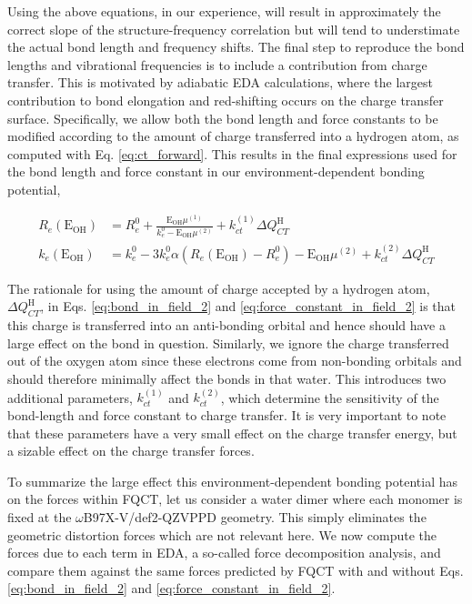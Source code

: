 \documentclass[journal=jctcce,manuscript=article]{achemso}
\begin{document}
Using the above equations, in our experience, will result in approximately the correct slope of the structure-frequency correlation but will tend to understimate the actual bond length and frequency shifts. The final step to reproduce the bond lengths and vibrational frequencies is to include a contribution from charge transfer. This is motivated by adiabatic EDA calculations, where the largest contribution to bond elongation and red-shifting occurs on the charge transfer surface.\cite{mao2017energy} Specifically, we allow both the bond length and force constants to be modified according to the amount of charge transferred into a hydrogen atom, as computed with Eq. \ref{eq:ct_forward}. This results in the final expressions used for the bond length and force constant in our environment-dependent bonding potential,

\begin{align}
  \label{eq:bond_in_field_2}
  R_e(\mathrm{E_{OH}})&=R_e^0+ \frac{\mathrm{E_{OH}}\mu^{(1)}}{k_e^0-\mathrm{E_{OH}}\mu^{(2)}} + k_{ct}^{(1)}\Delta Q_{CT}^{\mathrm{H}} \\
  \label{eq:force_constant_in_field_2}
  k_e(\mathrm{E_{OH}})&=k_e^0-3k_e^0\alpha\left(R_e(\mathrm{E_{OH}})-R_e^0\right)-\mathrm{E_{OH}}\mu^{(2)}+k_{ct}^{(2)}\Delta Q_{CT}^{\mathrm{H}}
\end{align}

The rationale for using the amount of charge accepted by a hydrogen atom, $\Delta Q_{CT}^{\mathrm{H}}$, in Eqs. \ref{eq:bond_in_field_2} and \ref{eq:force_constant_in_field_2} is that this charge is transferred into an anti-bonding orbital and hence should have a large effect on the  bond in question. Similarly, we ignore the charge transferred out of the oxygen atom since these electrons come from non-bonding orbitals and should therefore minimally affect the  bonds in that water. This introduces two additional parameters, $k_{ct}^{(1)}$ and $k_{ct}^{(2)}$, which determine the sensitivity of the bond-length and force constant to charge transfer. It is very important to note that these parameters have a very small effect on the charge transfer energy, but a sizable effect on the charge transfer forces.

To summarize the large effect this environment-dependent bonding potential has on the forces within FQCT, let us consider a water dimer where each monomer is fixed at the $\omega$B97X-V/def2-QZVPPD geometry. This simply eliminates the geometric distortion forces which are not relevant here. We now compute the forces due to each term in EDA, a so-called force decomposition analysis\cite{aldossary2023force}, and compare them against the same forces predicted by FQCT with and without Eqs. \ref{eq:bond_in_field_2} and \ref{eq:force_constant_in_field_2}.
\end{document}
